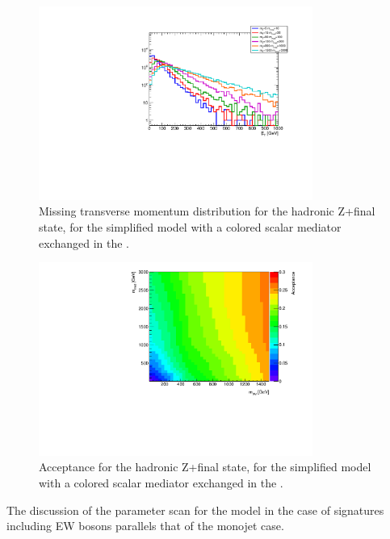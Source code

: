 \begin{figure}[h!]
	\centering  
	\includegraphics[width=0.8\textwidth]{figures/EW/monoZhad_TChannel/metPt}
	\caption{Missing transverse momentum distribution for the hadronic Z+\MET final state,
		for the simplified model with a colored scalar mediator exchanged in the \tchannel.}
	\label{fig:TChan_EW_Zhad_MET}
\end{figure}

\begin{figure}[h!]
	\centering  
	\includegraphics[width=0.8\textwidth]{figures/EW/monoZhad_TChannel/TChan_newplot.pdf}
	\caption{Acceptance for the hadronic Z+\MET final state,
		for the simplified model with a colored scalar mediator exchanged in the \tchannel.}
	\label{fig:TChan_EW_Zhad_acc}
\end{figure}

The discussion of the parameter scan for the \tchannel model
in the case of signatures including EW bosons
parallels that of the monojet case. 


